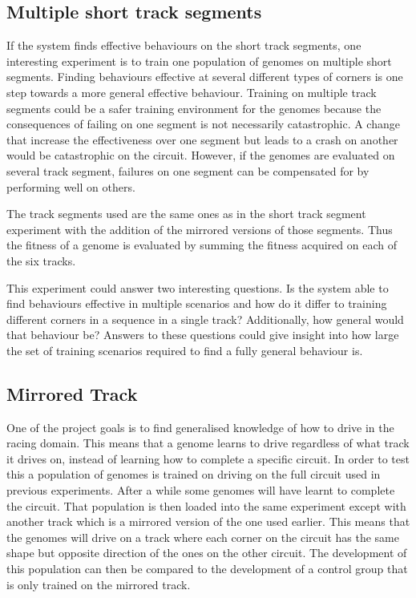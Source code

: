 \subsection{Multiple short track segments}

If the system finds effective behaviours on the short track segments, one interesting experiment is to train one population of genomes on multiple short segments. Finding behaviours effective at several different types of corners is one step towards a more general effective behaviour. Training on multiple track segments could be a safer training environment for the genomes because the consequences of failing on one segment is not necessarily catastrophic. A change that increase the effectiveness over one segment but leads to a crash on another would be catastrophic on the circuit. However, if the genomes are evaluated on several track segment, failures on one segment can be compensated for by performing well on others. 

The track segments used are the same ones as in the short track segment experiment with the addition of the mirrored versions of those segments. Thus the fitness of a genome is evaluated by summing the fitness acquired on each of the six tracks.

This experiment could answer two interesting questions. Is the system able to find behaviours effective in multiple scenarios and how do it differ to training different corners in a sequence in a single track? Additionally, how general would that behaviour be? Answers to these questions could give insight into how large the set of training scenarios required to find a fully general behaviour is. 


\subsection{Mirrored Track}
\label{method:mirror}
One of the project goals is to find generalised knowledge of how to drive in the racing domain. This means that a genome learns to drive regardless of what track it drives on, instead of learning how to complete a specific circuit. In order to test this a population of genomes is trained on driving on the full circuit used in previous experiments. After a while some genomes will have learnt to complete the circuit. That population is then loaded into the same experiment except with another track which is a mirrored version of the one used earlier. This means that the genomes will drive on a track where each corner on the circuit has the same shape but opposite direction of the ones on the other circuit. The development of this population can then be compared to the development of a control group that is only trained on the mirrored track. 

